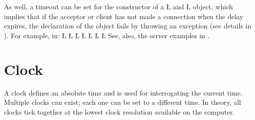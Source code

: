 \documentclass[openright,twoside]{report}
\begin{document}
As well, a timeout can be set for the constructor of a \LGinlinetrue\LGbegin\lgrinde\L{}\endlgrinde\LGend{} and \LGinlinetrue\LGbegin\lgrinde\L{}\endlgrinde\LGend{} object, which implies that if the acceptor or client has not made a connection when the delay expires, the declaration of the object fails by throwing an exception (see details in ).
For example, in:
\LGinlinefalse\LGbegin\lgrinde
\L{}
\L{\LB{}}
\CE{}\L{\LB{}}
\CE{}\L{\LB{}}
\CE{}\L{}
\L{\LB{}}
\CE{}\L{}
\CE{}\endlgrinde\LGend
See, also, the server examples in .


\section{Clock}
\label{s:Clock}

A clock defines an absolute time and is used for interrogating the current time.
Multiple clocks can exist;
each one can be set to a different time.
In theory, all clocks tick together at the lowest clock resolution available on the computer.
\end{document}
